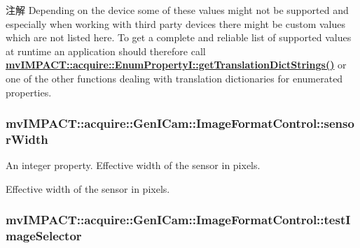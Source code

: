 \begin{DoxyNote}{注解}
Depending on the device some of these values might not be supported and especially when working with third party devices there might be custom values which are not listed here. To get a complete and reliable list of supported values at runtime an application should therefore call {\bfseries \hyperlink{classmv_i_m_p_a_c_t_1_1acquire_1_1_enum_property_i_a0ba6ccbf5ee69784d5d0b537924d26b6}{mv\+I\+M\+P\+A\+C\+T\+::acquire\+::\+Enum\+Property\+I\+::get\+Translation\+Dict\+Strings()}} or one of the other functions dealing with translation dictionaries for enumerated properties. 
\end{DoxyNote}
\hypertarget{classmv_i_m_p_a_c_t_1_1acquire_1_1_gen_i_cam_1_1_image_format_control_a8d8306c00755dc6bdaf9ef5b74806a62}{
\subsubsection[{sensor\+Width}]{ mv\+I\+M\+P\+A\+C\+T\+::acquire\+::\+Gen\+I\+Cam\+::\+Image\+Format\+Control\+::sensor\+Width}}\label{classmv_i_m_p_a_c_t_1_1acquire_1_1_gen_i_cam_1_1_image_format_control_a8d8306c00755dc6bdaf9ef5b74806a62}


An integer property. Effective width of the sensor in pixels. 

Effective width of the sensor in pixels. \hypertarget{classmv_i_m_p_a_c_t_1_1acquire_1_1_gen_i_cam_1_1_image_format_control_a34aeaf5d248f18129d9c3751c6b2fa24}{
\subsubsection[{test\+Image\+Selector}]{ mv\+I\+M\+P\+A\+C\+T\+::acquire\+::\+Gen\+I\+Cam\+::\+Image\+Format\+Control\+::test\+Image\+Selector}}\label{classmv_i_m_p_a_c_t_1_1acquire_1_1_gen_i_cam_1_1_image_format_control_a34aeaf5d248f18129d9c3751c6b2fa24}


